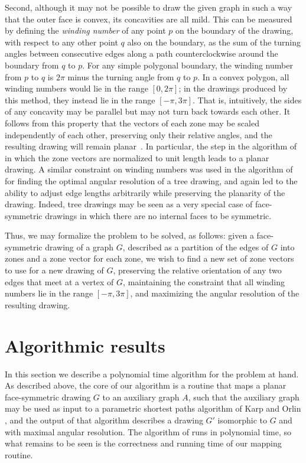 \documentclass[11pt,letter]{article}
\begin{document}
Second, although it may not be possible to draw the given graph in
such a way that the outer face is convex, its concavities are all
mild. This can be measured by defining the \emph{winding number} of
any point $p$ on the boundary of the drawing, with respect to any
other point $q$ also on the boundary, as the sum of the turning angles
between consecutive edges along a path counterclockwise around the
boundary from $q$ to $p$. For any simple polygonal boundary, the
winding number from $p$ to $q$ is $2\pi$ minus the turning angle from
$q$ to $p$. In a convex polygon, all winding numbers would lie in the
range $[0,2\pi]$; in the drawings produced by this method, they
instead lie in the range $[-\pi,3\pi]$. That is, intuitively, the
sides of any concavity may be parallel but may not turn back towards
each other. It follows from this property that the vectors of each
zone may be scaled independently of each other, preserving only their
relative angles, and the resulting drawing will remain
planar~\cite{Epp-GD-04}. In particular, the step in the algorithm
of~\cite{Epp-GD-04} in which the zone vectors are normalized to unit
length leads to a planar drawing. A similar constraint on winding
numbers was used in the algorithm of~\cite{EppCar-GD-06} for finding
the optimal angular resolution of a tree drawing, and again led to the
ability to adjust edge lengths arbitrarily while preserving the
planarity of the drawing. Indeed, tree drawings may be seen as a very
special case of face-symmetric drawings in which there are no internal
faces to be symmetric.

Thus, we may formalize the problem to be solved, as follows: given a
face-symmetric drawing of a graph $G$, described as a partition of the
edges of $G$ into zones and a zone vector for each zone, we wish to
find a new set of zone vectors to use for a new drawing of $G$,
preserving the relative orientation of any two edges that meet at a
vertex of $G$, maintaining the constraint that all winding numbers lie
in the range $[-\pi,3\pi]$, and maximizing the angular resolution of
the resulting drawing.

\section{Algorithmic results}
\label{section:algorithm}

In this section we describe a polynomial time algorithm for the problem at hand.  As described above, the core of our algorithm is a routine that maps a planar face-symmetric drawing $G$ to an auxiliary graph $A$, such that the auxiliary graph may be used as input to a parametric shortest paths algorithm of Karp and Orlin \cite{KarOrl-DAM-81}, and the output of that algorithm describes a drawing $G'$ isomorphic to $G$ and with maximal angular resolution.  The algorithm of \cite{KarOrl-DAM-81} runs in polynomial time, so what remains to be seen is the correctness and running time of our mapping routine.
\end{document}
